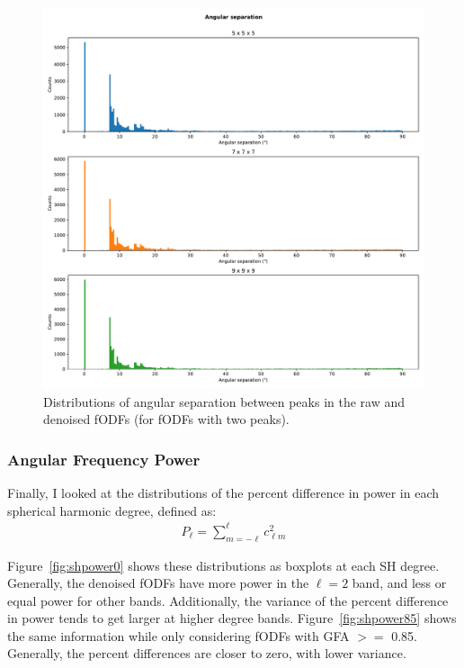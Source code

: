 \documentclass{article}
\begin{document}
\begin{figure}[H]
  \centering
  \includegraphics[width=0.6\linewidth]{../figs/angdifference_firsttwo}
  \captionsetup{width=0.6\linewidth}
  \caption{Distributions of angular separation between peaks in the raw and
    denoised fODFs (for fODFs with two peaks).}
  \label{fig:angdiff}
\end{figure}

\subsubsection{Angular Frequency Power}

Finally, I looked at the distributions of the percent difference in power in
each spherical harmonic degree, defined as:
\begin{align}
  P_{\ell} = \sum_{m=-\ell}^{\ell} c_{\ell m}^2
\end{align}

Figure~\ref{fig:shpower0} shows these distributions as boxplots at each SH
degree. Generally, the denoised fODFs have more power in the $\ell = 2$ band,
and less or equal power for other bands. Additionally, the variance of the
percent difference in power tends to get larger at higher degree
bands. Figure~\ref{fig:shpower85} shows the same information while only
considering fODFs with GFA $>=$ 0.85. Generally, the percent differences are
closer to zero, with lower variance. 
\end{document}
